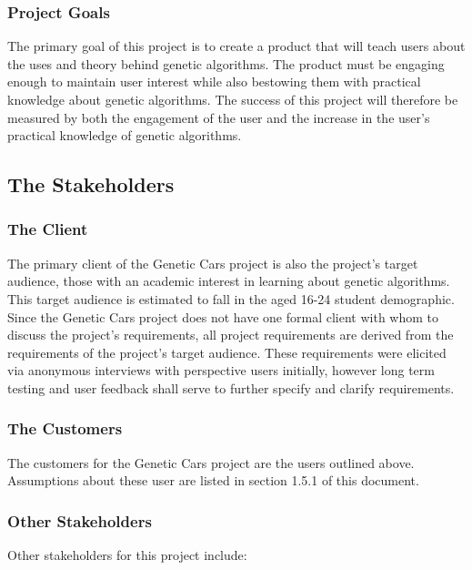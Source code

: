 \documentclass[12pt, titlepage]{article}
\begin{document}
\subsubsection{Project Goals}

The primary goal of this project is to create a product that will teach users 
about the uses and theory behind genetic algorithms. The product must be 
engaging enough to maintain user interest while also bestowing them with 
practical knowledge about genetic algorithms. The success of this project will 
therefore be measured by both the engagement of the user and the increase in the 
user's practical knowledge of genetic algorithms.

\subsection{The Stakeholders}

\subsubsection{The Client}

The primary client of the Genetic Cars project is also the project's target 
audience, those with an academic interest in learning about genetic algorithms. 
This target audience is estimated to fall in the aged 16-24 student demographic. 
Since the Genetic Cars project does not have one formal client with whom to 
discuss the project's requirements, all project requirements are derived from 
the requirements of the project's target audience. These requirements were 
elicited via anonymous interviews with perspective users initially, however long 
term testing and user feedback shall serve to further specify and clarify 
requirements.

\subsubsection{The Customers}

The customers for the Genetic Cars project are the users outlined above. 
Assumptions about these user are listed in section 1.5.1 of this document.

\subsubsection{Other Stakeholders}

Other stakeholders for this project include:\\
\end{document}

